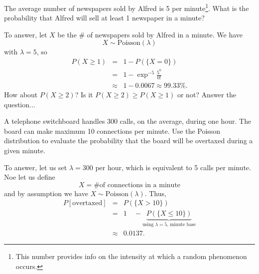 \documentclass[smaller, handout]{beamer}\usepackage[]{graphicx}\usepackage[]{color}
\newcommand{\bea}{\begin{eqnarray}}
\newcommand{\eea}{\end{eqnarray}}
\newcommand{\nn}{\nonumber}
\begin{document}
\begin{frame}{\secname}%

\begin{example}
The average number of newspapers sold by Alfred is 5 per minute\footnote{This number provides info on the intensity
at which a random phenomenon occurs.}. What is the probability that Alfred will sell at least 1 newspaper in a minute? \vspace{0.3cm}


To answer, let $X$ be the $\#$ of newspapers sold by Alfred in a minute. We have
$$
X \sim \text{Poisson}(\lambda)
$$
with $\lambda = 5$, so
\begin{eqnarray*}
P(X \geq 1) & = & 1- P(\{X=0\}) \\
& = & 1 - \exp^{-5} \frac{5^0}{0!} \\
& \approx & 1- 0.0067 \approx 99.33\%.
\end{eqnarray*}
How about $P(X \geq 2)$? Is it $P(X \geq 2) \geq P(X \geq 1)$ or not? Answer the question...
\end{example}
\end{frame}%



\begin{frame}{\secname}%

\begin{example}
A telephone switchboard handles 300 calls, on the average, during one hour. The board
can make maximum 10 connections per minute. Use the Poisson
distribution to evaluate the probability that the board will be overtaxed during a given minute.

\vspace{0.4cm}

To answer, let us set  $\lambda = 300$ per hour, which is equivalent to 5 calls per minute. Noe let us define
$$
X = \text{\# of connections in a minute}
$$
and by assumption we have $X \sim \text{Poisson}(\lambda)$. Thus,
\bea
P[\text{overtaxed}] &=& P(\{X > 10\}) \nn \\
&=& 1 \quad - \underbrace{P(\{X \leq 10\})}_{\text{using $\lambda=5$,  minute base}} \nn \\
&\approx& 0.0137. \nn
\eea
\end{example}
\end{frame}
\end{document}
